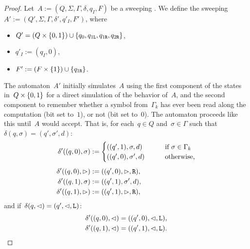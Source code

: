 \begin{proof}
	\newcommand{\ql}{q_{1\mathtt{L}}}
	\newcommand{\qr}{q_{1\mathtt{R}}}
	\newcommand{\qqr}{q_{2\mathtt{R}}}

	Let~$A:=(Q,\Sigma,\Gamma,\delta,q_I,F)$ be a sweeping \kDLA.
	We define the sweeping \kDLA~$A':=(Q',\Sigma,\Gamma,\delta',q'_I,F')$, where
	\begin{itemize}
		\item $Q'=(Q\times\set{0,1})\cup\set{q_0,\ql,\qr,\qqr}$,
		\item $q'_I:=(q_I,0)$,
		\item $F':=(F\times\set{1})\cup\set{\qr}$.
	\end{itemize}

	The automaton~$A'$ initially simulates~$A$ using the first component of the states in~$Q\times\{0,1\}$ for a direct simulation of the behavior of~$A$, and the second component to remember whether a symbol from~$\Gamma_k$ has ever been read along the computation (bit set to~$1$), or not (bit set to~$0$).
	The automaton proceeds like this until~$A$ would accept.
	That is, for each~$q\in Q$ and~$\sigma\in\Gamma$ such that~$\delta(q,\sigma)=(q',\sigma',d)$:
	\begin{align*}
		\delta'((q,0),\sigma) & :=\begin{cases}
			                          ((q',1),\sigma,d) \qquad  & \text{if }\sigma\in\Gamma_k \\
			                          ((q',0),\sigma',d) \qquad & \text{otherwise,}
		                          \end{cases} \\[1ex]
		\delta'((q,0),\rhd)   & :=((q',0),\rhd,\mathtt R) \text,                                \\
		\delta'((q,1),\sigma) & :=((q',1),\sigma',d) \text,                               \\
		\delta'((q,1),\rhd)   & :=((q',1),\rhd,\mathtt R) \text,
	\end{align*}
	and if~$\delta(q,\lhd)=(q',\lhd,\mathtt L)$:
	\begin{align*}
		\delta'((q,0),\lhd) & =((q',0),\lhd,\mathtt L) \text, \\
		\delta'((q,1),\lhd) & =((q',1),\lhd,\mathtt L) \text.
	\end{align*}


\end{proof}
